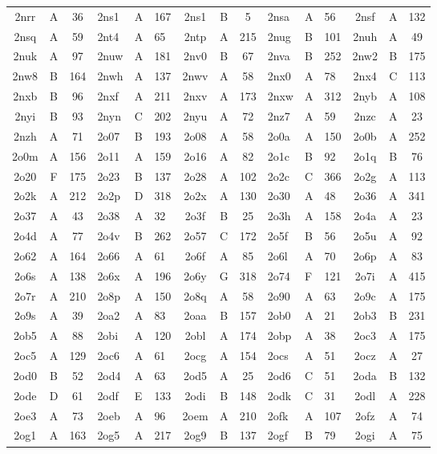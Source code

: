 \begin{longtable}{|c|c|c| a|a|a| c|c|c| a|a|a| c|c|c|}
2nrr & A & 36 & 2ns1 & A & 167 & 2ns1 & B & 5 & 2nsa & A & 56 & 2nsf & A & 132\\
2nsq & A & 59 & 2nt4 & A & 65 & 2ntp & A & 215 & 2nug & B & 101 & 2nuh & A & 49\\
2nuk & A & 97 & 2nuw & A & 181 & 2nv0 & B & 67 & 2nva & B & 252 & 2nw2 & B & 175\\
2nw8 & B & 164 & 2nwh & A & 137 & 2nwv & A & 58 & 2nx0 & A & 78 & 2nx4 & C & 113\\
2nxb & B & 96 & 2nxf & A & 211 & 2nxv & A & 173 & 2nxw & A & 312 & 2nyb & A & 108\\
2nyi & B & 93 & 2nyn & C & 202 & 2nyu & A & 72 & 2nz7 & A & 59 & 2nzc & A & 23\\
2nzh & A & 71 & 2o07 & B & 193 & 2o08 & A & 58 & 2o0a & A & 150 & 2o0b & A & 252\\
2o0m & A & 156 & 2o11 & A & 159 & 2o16 & A & 82 & 2o1c & B & 92 & 2o1q & B & 76\\
2o20 & F & 175 & 2o23 & B & 137 & 2o28 & A & 102 & 2o2c & C & 366 & 2o2g & A & 113\\
2o2k & A & 212 & 2o2p & D & 318 & 2o2x & A & 130 & 2o30 & A & 48 & 2o36 & A & 341\\
2o37 & A & 43 & 2o38 & A & 32 & 2o3f & B & 25 & 2o3h & A & 158 & 2o4a & A & 23\\
2o4d & A & 77 & 2o4v & B & 262 & 2o57 & C & 172 & 2o5f & B & 56 & 2o5u & A & 92\\
2o62 & A & 164 & 2o66 & A & 61 & 2o6f & A & 85 & 2o6l & A & 70 & 2o6p & A & 83\\
2o6s & A & 138 & 2o6x & A & 196 & 2o6y & G & 318 & 2o74 & F & 121 & 2o7i & A & 415\\
2o7r & A & 210 & 2o8p & A & 150 & 2o8q & A & 58 & 2o90 & A & 63 & 2o9c & A & 175\\
2o9s & A & 39 & 2oa2 & A & 83 & 2oaa & B & 157 & 2ob0 & A & 21 & 2ob3 & B & 231\\
2ob5 & A & 88 & 2obi & A & 120 & 2obl & A & 174 & 2obp & A & 38 & 2oc3 & A & 175\\
2oc5 & A & 129 & 2oc6 & A & 61 & 2ocg & A & 154 & 2ocs & A & 51 & 2ocz & A & 27\\
2od0 & B & 52 & 2od4 & A & 63 & 2od5 & A & 25 & 2od6 & C & 51 & 2oda & B & 132\\
2ode & D & 61 & 2odf & E & 133 & 2odi & B & 148 & 2odk & C & 31 & 2odl & A & 228\\
2oe3 & A & 73 & 2oeb & A & 96 & 2oem & A & 210 & 2ofk & A & 107 & 2ofz & A & 74\\
2og1 & A & 163 & 2og5 & A & 217 & 2og9 & B & 137 & 2ogf & B & 79 & 2ogi & A & 75\\

\end{longtable}
